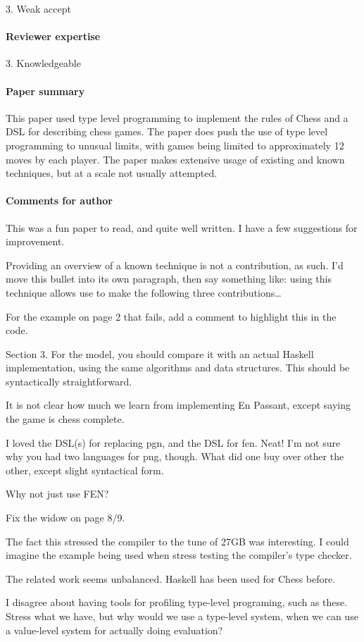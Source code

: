 3. Weak accept

\paragraph{Reviewer expertise}

3. Knowledgeable

\paragraph{Paper summary}

This paper used type level programming to implement the rules of Chess and a DSL for describing chess games. The paper does push the use of type level programming to unusual limits, with games being limited to approximately 12 moves by each player. The paper makes extensive usage of existing and known techniques, but at a scale not usually attempted.

\paragraph{Comments for author}

This was a fun paper to read, and quite well written. I have a few suggestions for improvement.

Providing an overview of a known technique is not a contribution, as such. I'd move this bullet into its own paragraph, then say something like: using this technique allows use to make the following three contributions…

For the example on page 2 that fails, add a comment to highlight this in the code.

Section 3. For the model, you should compare it with an actual Haskell implementation, using the same algorithms and data structures. This should be syntactically straightforward.

It is not clear how much we learn from implementing En Passant, except saying the game is chess complete.

I loved the DSL(s) for replacing pgn, and the DSL for fen. Neat! I'm not sure why you had two languages for png, though. What did one buy over other the other, except slight syntactical form.

Why not just use FEN?

Fix the widow on page 8/9.

The fact this stressed the compiler to the tune of 27GB was interesting. I could imagine the example being used when stress testing the compiler's type checker.

The related work seems unbalanced. Haskell has been used for Chess before.

I disagree about having tools for profiling type-level programing, such as these. Stress what we have, but why would we use a type-level system, when we can use a value-level system for actually doing evaluation?